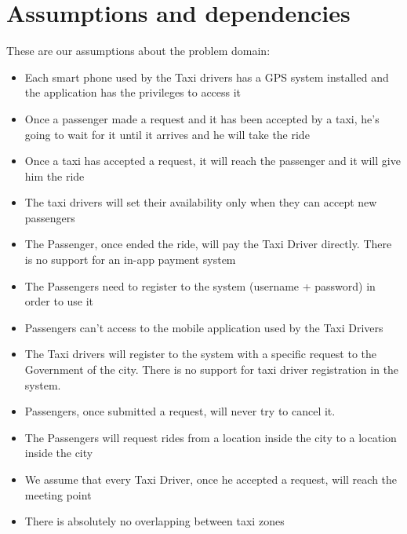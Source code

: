 \section{Assumptions and dependencies}
These are our assumptions about the problem domain:
\begin{itemize}
\item Each smart phone used by the Taxi drivers has a GPS system installed and the application has the privileges to access  it
\item Once a passenger made a request and it has been accepted by a taxi, he's going to wait for it until it arrives and he will take the ride
\item Once a taxi has accepted a request, it will reach the passenger and it will give him the ride
\item The taxi drivers will set their availability only when they can accept new passengers
\item The Passenger, once ended the ride, will pay the Taxi Driver directly. There is no support for an in-app payment system
\item The Passengers need to register to the system (username + password) in order to use it
\item Passengers can't access to the mobile application used by the Taxi Drivers
\item The Taxi drivers will register to the system with a specific request to the Government of the city. There is no support for taxi driver registration in the system.
\item Passengers, once submitted a request, will never try to cancel it.
\item The Passengers will request rides from a location inside the city to a location inside the city
\item We assume that every Taxi Driver, once he accepted a request, will reach the meeting point
\item There is absolutely no overlapping between taxi zones
\end{itemize}

